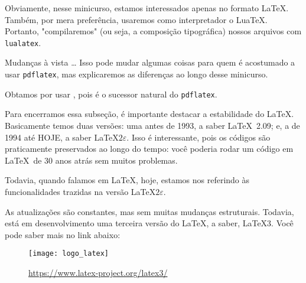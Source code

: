 Obviamente, nesse minicurso, estamos interessados apenas no formato \LaTeX.
Também, por mera preferência, usaremos como interpretador o Lua\TeX.
Portanto, "compilaremos" (ou seja, a composição tipográfica) nossos arquivos 
com \texttt{lualatex}.

\begin{atencao}{Mudanças à vista \ldots}{\exclamacao}
  Isso pode mudar algumas coisas para quem é acostumado a usar \texttt{pdflatex}, 
  mas explicaremos as diferenças ao longo desse minicurso.  
\end{atencao}

Obtamos por usar \lualatex, pois é o sucessor natural do \texttt{pdflatex}. 

Para encerramos essa subseção, é importante destacar a estabilidade do \LaTeX.
Basicamente temos duas versões: uma antes de 1993, a saber \LaTeX~2.09; e,
a de 1994 até HOJE, a saber \LaTeX$2\varepsilon$.
Isso é interessante, pois os códigos são praticamente preservados ao longo do 
tempo: você poderia rodar um código em \LaTeX\ de 30 anos atrás sem muitos 
problemas.

Todavia, quando falamos em \LaTeX{}, hoje, estamos nos referindo às 
funcionalidades trazidas na versão \LaTeX$2\varepsilon$.

As atualizações são constantes, mas sem muitas mudanças estruturais.
Todavia, está em desenvolvimento uma terceira versão do \LaTeX, a saber, \LaTeX3.
Você pode saber mais no link abaixo:

\begin{figure}[!htbp]
  \centering
  \texttt{[image: logo\_latex]}
  \caption{\href{https://www.latex-project.org/latex3/}{\textcolor{azulUFRB}{https://www.latex-project.org/latex3/}}}
\end{figure}

